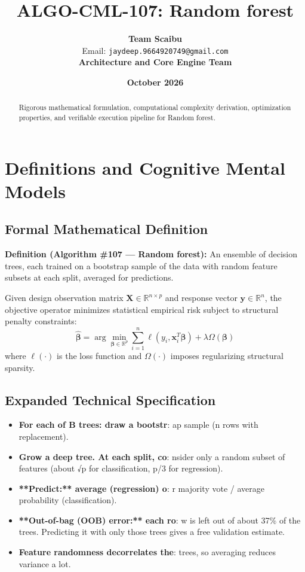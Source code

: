 \documentclass[11pt,a4paper]{article}
\title{\textbf{ALGO-CML-107: Random forest}}
\author{\textbf{Team Scaibu} \\ \small Email: \texttt{jaydeep.9664920749@gmail.com} \\ \small \textbf{Architecture and Core Engine Team}}
\date{\textbf{October 2026}}
\theoremstyle{definition}
\begin{document}
\maketitle

\begin{abstract}
Rigorous mathematical formulation, computational complexity derivation, optimization properties, and verifiable execution pipeline for Random forest.
\end{abstract}

\section{Definitions and Cognitive Mental Models}

\subsection{Formal Mathematical Definition}
\textbf{Definition (Algorithm \#107 --- Random forest):}
An ensemble of decision trees, each trained on a bootstrap sample of the data with random feature subsets at each split, averaged for predictions.

Given design observation matrix $\mathbf{X} \in \mathbb{R}^{n \times p}$ and response vector $\mathbf{y} \in \mathbb{R}^n$, the objective operator minimizes statistical empirical risk subject to structural penalty constraints:
\begin{equation}
\hat{\boldsymbol{\beta}} = \arg\min_{\boldsymbol{\beta} \in \mathbb{R}^p} \sum_{i=1}^n \ell(y_i, \mathbf{x}_i^T \boldsymbol{\beta}) + \lambda \Omega(\boldsymbol{\beta})
\end{equation}
where $\ell(\cdot)$ is the loss function and $\Omega(\cdot)$ imposes regularizing structural sparsity.

\subsection{Expanded Technical Specification}
\begin{itemize}
\item \textbf{For each of B trees: draw a bootstr}: ap sample (n rows with replacement).
\item \textbf{Grow a deep tree. At each split, co}: nsider only a random subset of features (about √p for classification, p/3 for regression).
\item \textbf{**Predict:** average (regression) o}: r majority vote / average probability (classification).
\item \textbf{**Out-of-bag (OOB) error:** each ro}: w is left out of about 37\% of the trees. Predicting it with only those trees gives a free validation estimate.
\item \textbf{Feature randomness decorrelates the}:  trees, so averaging reduces variance a lot.
\end{itemize}
\end{document}
